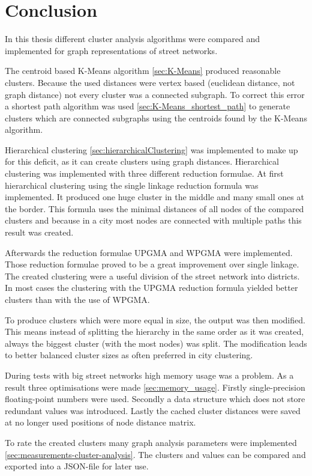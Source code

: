 \chapter{Conclusion}
In this thesis different cluster analysis algorithms were compared and implemented for graph representations of street networks.

The centroid based K-Means algorithm \ref{sec:K-Means} produced reasonable clusters. Because the used distances were vertex based (euclidean distance, not graph distance) not every cluster was a connected subgraph. To correct this error a shortest path algorithm was used \ref{sec:K-Means_shortest_path} to generate clusters which are connected subgraphs using the centroids found by the K-Means algorithm.

Hierarchical clustering \ref{sec:hierarchicalClustering} was implemented to make up for this deficit, as it can create clusters using graph distances. Hierarchical clustering was implemented with three different reduction formulae. At first hierarchical clustering using the single linkage reduction formula was implemented. It produced one huge cluster in the middle and many small ones at the border. This formula uses the minimal distances of all nodes of the compared clusters and because in a city most nodes are connected with multiple paths this result was created.

Afterwards the reduction formulae \gls{UPGMA} and \gls{WPGMA} were implemented. Those reduction formulae proved to be a great improvement over single linkage. The created clustering were a useful division of the street network into districts. In most cases the clustering with the \gls{UPGMA} reduction formula yielded better clusters than with the use of \gls{WPGMA}.

To produce clusters which were more equal in size, the output was then modified. This means instead of splitting the hierarchy in the same order as it was created, always the biggest cluster (with the most nodes) was split. The modification leads to better balanced cluster sizes as often preferred in city clustering.

During tests with big street networks high memory usage was a problem. As a result three optimisations were made \ref{sec:memory_usage}. Firstly single-precision floating-point numbers were used. Secondly a data structure which does not store redundant values was introduced. Lastly the cached cluster distances were saved at no longer used positions of node distance matrix.

To rate the created clusters many graph analysis parameters were implemented \ref{sec:measurements-cluster-analysis}. The clusters and values can be compared and exported into a JSON-file for later use.